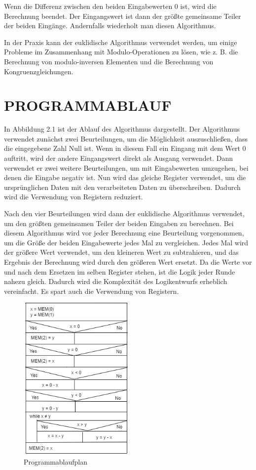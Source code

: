 \noindent Wenn die Differenz zwischen den beiden Eingabewerten 0 ist, wird die Berechnung beendet. Der Eingangswert ist dann der größte gemeinsame Teiler der beiden Eingänge. Andernfalls wiederholt man diesen Algorithmus.

\noindent In der Praxis kann der euklidische Algorithmus verwendet werden, um einige Probleme im Zusammenhang mit Modulo-Operationen zu lösen, wie z. B. die Berechnung von modulo-inversen Elementen und die Berechnung von Kongruenzgleichungen.

\section{PROGRAMMABLAUF}

In Abbildung 2.1 ist der Ablauf des Algorithmus dargestellt. Der Algorithmus verwendet zunächst zwei Beurteilungen, um die Möglichkeit auszuschließen, dass die eingegebene Zahl Null ist. Wenn in diesem Fall ein Eingang mit dem Wert 0 auftritt, wird der andere Eingangswert direkt als Ausgang verwendet. Dann verwendet er zwei weitere Beurteilungen, um mit Eingabewerten umzugehen, bei denen die Eingabe negativ ist. Nun wird das gleiche Register verwendet, um die ursprünglichen Daten mit den verarbeiteten Daten zu überschreiben. Dadurch wird die Verwendung von Registern reduziert.

\vspace{\baselineskip}

\noindent Nach den vier Beurteilungen wird dann der euklidische Algorithmus verwendet, um den größten gemeinsamen Teiler der beiden Eingaben zu berechnen. Bei diesem Algorithmus wird vor jeder Berechnung eine Beurteilung vorgenommen, um die Größe der beiden Eingabewerte jedes Mal zu vergleichen. Jedes Mal wird der größere Wert verwendet, um den kleineren Wert zu subtrahieren, und das Ergebnis der Berechnung wird durch den größeren Wert ersetzt. Da die Werte vor und nach dem Ersetzen im selben Register stehen, ist die Logik jeder Runde nahezu gleich. Dadurch wird die Komplexität des Logikentwurfs erheblich vereinfacht. Es spart auch die Verwendung von Registern.
 
\vspace{\baselineskip}

\begin{figure}[!htb]
  \centering
  \includegraphics[width=0.5\textwidth]{images/ablaufplan.png}
  \caption[Programmablaufplan]{Programmablaufplan}
  \label{fig:ablaufplan}
\end{figure}



\cleardoublepage

